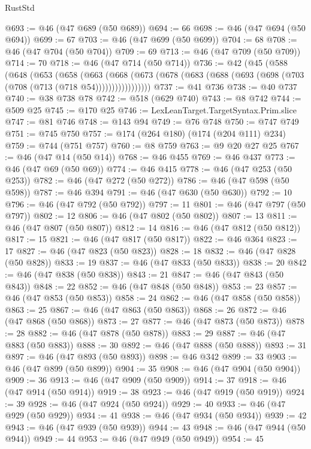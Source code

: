 \begin{lexlean}{RustStd}
\begin{coremodule}
{\begin{coremodule}
{{{{{{{{{{{{{{@693 := @46 (@47 @689 (@50 @689))
@694 := 66
@698 := @46 (@47 @694 (@50 @694))
@699 := 67
@703 := @46 (@47 @699 (@50 @699))
@704 := 68
@708 := @46 (@47 @704 (@50 @704))
@709 := 69
@713 := @46 (@47 @709 (@50 @709))
@714 := 70
@718 := @46 (@47 @714 (@50 @714))
@736 := @42
    (@45
      (@588
        (@648
          (@653
            (@658
              (@663
                (@668
                  (@673 (@678 (@683 (@688 (@693 (@698 (@703 (@708 (@713 (@718 @54)))))))))))))))))
@737 := @41 @736
@738 := @40 @737
@740 := @38 @738 @78
@742 := @518 (@629 @740)
@743 := @8 @742
@744 := @509 @25
@745 := @170 @25
@746 := LexLeanTarget.TargetSyntax.Prim.slice
@747 := @81 @746
@748 := @143 @94
@749 := @76 @748
@750 := @747 @749
@751 := @745 @750
@757 := @174 (@264 @180) (@174 (@204 @111) @234)
@759 := @744 (@751 @757)
@760 := @8 @759
@763 := @9 @20 @27 @25
@767 := @46 (@47 @14 (@50 @14))
@768 := @46 @455
@769 := @46 @437
@773 := @46 (@47 @69 (@50 @69))
@774 := @46 @415
@778 := @46 (@47 @253 (@50 @253))
@782 := @46 (@47 @272 (@50 @272))
@786 := @46 (@47 @598 (@50 @598))
@787 := @46 @394
@791 := @46 (@47 @630 (@50 @630))
@792 := 10
@796 := @46 (@47 @792 (@50 @792))
@797 := 11
@801 := @46 (@47 @797 (@50 @797))
@802 := 12
@806 := @46 (@47 @802 (@50 @802))
@807 := 13
@811 := @46 (@47 @807 (@50 @807))
@812 := 14
@816 := @46 (@47 @812 (@50 @812))
@817 := 15
@821 := @46 (@47 @817 (@50 @817))
@822 := @46 @364
@823 := 17
@827 := @46 (@47 @823 (@50 @823))
@828 := 18
@832 := @46 (@47 @828 (@50 @828))
@833 := 19
@837 := @46 (@47 @833 (@50 @833))
@838 := 20
@842 := @46 (@47 @838 (@50 @838))
@843 := 21
@847 := @46 (@47 @843 (@50 @843))
@848 := 22
@852 := @46 (@47 @848 (@50 @848))
@853 := 23
@857 := @46 (@47 @853 (@50 @853))
@858 := 24
@862 := @46 (@47 @858 (@50 @858))
@863 := 25
@867 := @46 (@47 @863 (@50 @863))
@868 := 26
@872 := @46 (@47 @868 (@50 @868))
@873 := 27
@877 := @46 (@47 @873 (@50 @873))
@878 := 28
@882 := @46 (@47 @878 (@50 @878))
@883 := 29
@887 := @46 (@47 @883 (@50 @883))
@888 := 30
@892 := @46 (@47 @888 (@50 @888))
@893 := 31
@897 := @46 (@47 @893 (@50 @893))
@898 := @46 @342
@899 := 33
@903 := @46 (@47 @899 (@50 @899))
@904 := 35
@908 := @46 (@47 @904 (@50 @904))
@909 := 36
@913 := @46 (@47 @909 (@50 @909))
@914 := 37
@918 := @46 (@47 @914 (@50 @914))
@919 := 38
@923 := @46 (@47 @919 (@50 @919))
@924 := 39
@928 := @46 (@47 @924 (@50 @924))
@929 := 40
@933 := @46 (@47 @929 (@50 @929))
@934 := 41
@938 := @46 (@47 @934 (@50 @934))
@939 := 42
@943 := @46 (@47 @939 (@50 @939))
@944 := 43
@948 := @46 (@47 @944 (@50 @944))
@949 := 44
@953 := @46 (@47 @949 (@50 @949))
@954 := 45
}}}}}}}}}}}}}}
\end{coremodule}}
\end{coremodule}
\end{lexlean}
